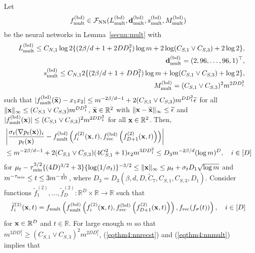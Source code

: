 \documentclass[twoside,11pt]{article}
\def\cF{\mathcal F}
\newcommand{\bd}{{\bf d}}
\newcommand{\bx}{{\bf x}}
\newcommand{\bbR}{{\mathbb R}}
\newcommand{\be}{\begin{equation}}
\newcommand{\ee}{\end{equation}}
\newcommand{\bean}{\setlength\arraycolsep{1pt}\begin{eqnarray*}}
\newcommand{\eean}{\end{eqnarray*}}
\begin{document}
Let 
\bean
f_{{\rm mult}}^{(\rm bd)} \in \cF_{\rm NN}( L_{{\rm mult}}^{(\rm bd)}, \bd_{{\rm mult}}^{(\rm bd)}, s_{{\rm mult}}^{(\rm bd)}, M_{{\rm mult}}^{(\rm bd)} )
\eean
be the neural networks in Lemma~\ref{secnn:mult} with
\bean
&& L_{{\rm mult}}^{(\rm bd)} \leq C_{N,1} \log 2 \{ ( 2\beta / d + 1 + 2 D D_{1}^2) \log m  + 2 \log (C_{S,1} \vee C_{S,3} ) + 2\log 2  \},
\\
&& \bd_{{\rm mult}}^{(\rm bd)} = (2,96,\ldots,96,1)^{\top},
\\
&& s_{{\rm mult}}^{(\rm bd)} \leq C_{N,1} 2 \{ ( 2\beta / d + 1 + D D_{1}^2 ) \log m  +  \log ( C_{S,1} \vee C_{S,3}) + \log 2 \},
\\
&& M_{{\rm mult}}^{(\rm bd)} = ( C_{S,1} \vee C_{S,3})^{2}  m^{2 D D_{1}^2}
\eean
such that $\vert f_{{\rm mult}}^{(\rm bd)} (\widetilde \bx) - x_1 x_2 \vert \leq m^{-2\beta /d - 1} + 2( C_{S,1} \vee C_{S,3}) m^{D D_{1}^2 } \widetilde \epsilon$ for all $\|\bx\|_{\infty} \leq ( C_{S,1} \vee C_{S,3}) m^{D D_{1}^2 }$, $\widetilde \bx \in \bbR^{2}$ with $\|\bx-\widetilde \bx \|_{\infty} \leq \widetilde \epsilon$ and $\vert f_{{\rm mult}}^{(\rm bd)} (\bx) \vert \leq   ( C_{S,1} \vee C_{S,3})^{2} m^{2 D D_{1}^2} $ for all $\bx \in \bbR^2$.
Then,
\be
\begin{split}
& \left\vert \frac{\sigma_t (\nabla p_t(\bx))_{i}}{p_t(\bx)} - f_{{\rm mult}}^{(\rm bd)} \left( f_i^{(2)}(\bx,t) ,  f_{\rm rec}^{(\rm bd)}\left(f_{D+1}^{(2)}(\bx,t) \right) \right)  \right\vert 
\\
& \leq m^{-2\beta /d - 1} + 2( C_{S,1} \vee C_{S,3})(4 C_{S,1}^2 + 1) \epsilon_{2} m^{3 D D_{1}^2}   \leq  D_{3} m^{-2\beta / d} (\log m)^{D}, \quad i \in [D]
\label{eqthm4:nn2}
\end{split} \ee
for $\mu_t-   \tau_{\rm min}^{3/2} \{    (4D)^{3/2} +3  \} \{ \log (1/\sigma_t)\}^{-3/2} \leq  \|\bx\|_{\infty} \leq \mu_t + \sigma_t D_{1} \sqrt{\log m}$ and $m^{-\tau_{\rm min}} \leq t \leq  3 m^{-\frac{1}{2D}}$,
where $D_{3} = D_{3} (\beta, d, D, \widetilde C_{7}, C_{S,1}, C_{S,3}, D_{1} )$.
Consider functions $\widetilde f_{1}^{(2)},\ldots,\widetilde f_{D}^{(2)} : \bbR^{D} \times \bbR \to \bbR$ such that
\bean
\widetilde f^{(2)}_{i}(\bx,t) =  f_{\rm mult} \left( f_{{\rm mult}}^{(\rm bd)} \left( f_i^{(2)}(\bx,t) ,  f_{\rm rec}^{(\rm bd)}\left(f_{D+1}^{(2)}(\bx,t) \right) \right) , f_{\rm rec} ( f_{\sigma}(t)) \right), \quad i \in [D]
\eean
for $\bx \in \bbR^{D}$ and $t \in \bbR$.
For large enough $m$ so that $m^{3D D_{1}^2} \geq ( C_{S,1} \vee C_{S,3})^{2} m^{2 D D_{1}^2}$, (\ref{eqthm4:nnrecst}) and (\ref{eqthm4:nnmult}) implies that
\end{document}

